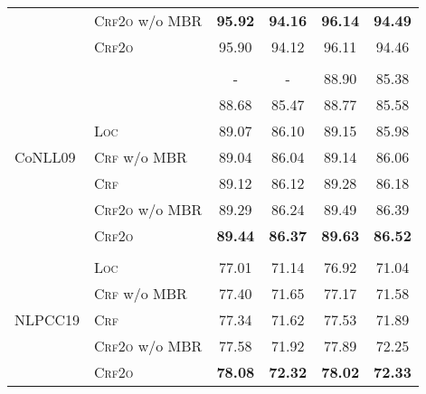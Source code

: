 \begin{table}[tb!]
\begin{tabular}{llcccc}
		                         & \textsc{Crf2o} w/o MBR            & \textbf{95.92} & \textbf{94.16} & \textbf{96.14}                   & \textbf{94.49}                   \\
		                         & \textsc{Crf2o}                    & 95.90          & 94.12          & 96.11                            & 94.46                            \\[2pt]
		\hline
		\\[-15pt]
		\multirow{7}{*}{CoNLL09} & \citet{dozat-etal-2017-biaffine}  & -              & -              & 88.90                            & 85.38                            \\
		                         & \citet{li-etal-2019-attentive}    & 88.68          & 85.47          & 88.77                            & 85.58                            \\[3pt]
		                         & \textsc{Loc}                      & 89.07          & 86.10          & 89.15                            & 85.98                            \\
		                         & \textsc{Crf} w/o MBR              & 89.04          & 86.04          & 89.14                            & 86.06                            \\
		                         & \textsc{Crf}                      & 89.12          & 86.12          & 89.28                            & 86.18\rlap{$^\dagger$}           \\
		                         & \textsc{Crf2o} w/o MBR            & 89.29          & 86.24          & 89.49                            & 86.39                            \\
		                         & \textsc{Crf2o}                    & \textbf{89.44} & \textbf{86.37} & \textbf{89.63}\rlap{$^\ddagger$} & \textbf{86.52}\rlap{$^\ddagger$} \\[2pt]
		\hline
		\\[-15pt]
		\multirow{5}{*}{NLPCC19} & \textsc{Loc}                      & 77.01          & 71.14          & 76.92                            & 71.04                            \\
		                         & \textsc{Crf} w/o MBR              & 77.40          & 71.65          & 77.17                            & 71.58                            \\
		                         & \textsc{Crf}                      & 77.34          & 71.62          & 77.53\rlap{$^\ddagger$}          & 71.89\rlap{$^\ddagger$}          \\
		                         & \textsc{Crf2o} w/o MBR            & 77.58          & 71.92          & 77.89                            & 72.25                            \\
		                         & \textsc{Crf2o}                    & \textbf{78.08} & \textbf{72.32} & \textbf{78.02}\rlap{$^\ddagger$} & \textbf{72.33}\rlap{$^\ddagger$} \\
		\bottomrule
	\end{tabular}
	\label{table:dev-test}
\end{table}


